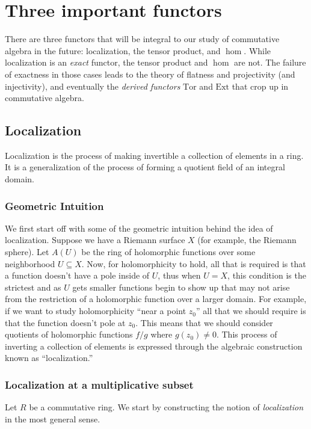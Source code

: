
\chapter{Three important functors}

There are three functors that will be integral to our study of commutative
algebra in the future: localization, the tensor product, and $\hom$.
While localization is an \emph{exact} functor, the tensor product and $\hom$
are not. The failure of exactness in those cases leads to the theory of
flatness and projectivity (and injectivity), and eventually the \emph{derived functors}
$\mathrm{Tor}$ and $\mathrm{Ext}$ that crop up in commutative algebra.

\section{Localization}

Localization is the process of making invertible a collection of elements in a
ring. It is a generalization of the process of forming a quotient field of an
integral domain.

\subsection{Geometric Intuition}
We first start off with some of the geometric intuition behind the idea of
localization. Suppose we have a Riemann surface $X$ (for example, the Riemann
sphere). Let $A(U)$ be the ring of holomorphic functions over some neighborhood
$U\subseteq X$. Now, for holomorphicity to hold, all that is required is
that a function doesn't have a pole inside of $U$, thus when $U=X$, this
condition is the strictest and as $U$ gets smaller functions begin to show
up that may not arise from the restriction of a holomorphic function over
a larger domain. For example, if we want to study holomorphicity ``near a
point $z_0$'' all that we should require is that the function doesn't pole at
$z_0$. This means that we should consider quotients of holomorphic functions
$f/g$ where $g(z_0)\neq 0$. This process of inverting a collection of elements
is expressed through the algebraic construction known as ``localization.''


\subsection{Localization at a multiplicative subset}

Let $R$ be a commutative ring.
We start by constructing the notion of \emph{localization} in the most general
sense.

